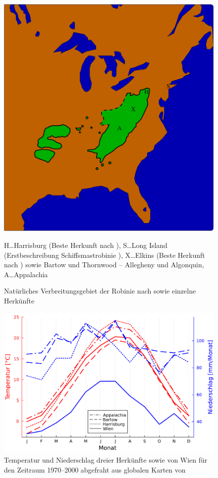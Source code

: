 \documentclass[twocolumn]{scrartcl}
\begin{document}
\begin{figure}[htbp]
  \centering
  \includegraphics[width=.9\linewidth]{./bild/map4}
  \caption{Natürliches Verbreitungsgebiet der Robinie nach \citet{mcalister1971robinie,little1971treeAtlas} sowie einzelne Herkünfte}
  \footnotesize{H\dots Harrisburg (Beste Herkunft nach \citet{cobbett1825woodlands}),
    S\dots Long Island (Erstbeschreibung Schiffsmastrobinie \citet{raber1936shipmast}),
    X\dots Elkins (Beste Herkunft nach \citet{hopp1941robinie}) sowie Bartow und Thornwood -- Allegheny und Algonquin,
    A\dots Appalachia}
  \label{fig:verbreitungNatuerlich}
\end{figure}

\begin{figure}[htbp]
  \centering
  \includegraphics[width=.9\linewidth]{./bild/wetter}
  \caption{Temperatur und Niederschlag dreier Herkünfte sowie von Wien für den
  Zeitraum 1970--2000 abgefraht aus globalen Karten von \citet{worldclim2017}}
  \label{fig:wetter}
\end{figure}
\end{document}
